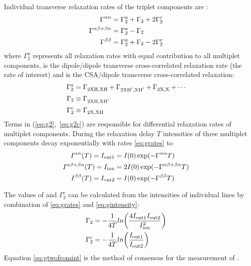 \documentclass[twocolumn]{svjour3}           %
\begin{document}
Individual transverse relaxation rates of the triplet components are 
\cite{kumar_cross-correlations_2000,banci_side_2001,miclet_relaxation-optimized_2004}:
\begin{subequations}
\label{eq:grates} 
\begin{align}
\label{eq:gaa} 
  \textrm{\ensuremath{\Gamma}}^{\alpha\alpha}    & = \Gamma_2^a + \Gamma_2 + 2 \Gamma_2^c  \\
  \label{eq:gab} 
  \textrm{\ensuremath{\Gamma}}^{\alpha\beta + \beta\alpha}  & = \Gamma_2^a - \Gamma_2 \\
  \label{eq:gbb} 
  \textrm{\ensuremath{\Gamma}}^{\beta\beta}    & = \Gamma_2^a + \Gamma_2 - 2 \Gamma_2^c
\end{align}
\end{subequations}
where $\Gamma_2^a$ represents all relaxation rates with equal contribution 
to all  multiplet components, \gtwo{} is the dipole\slash dipole transverse 
cross-correlated relaxation rate (the rate of interest) and \gtwoCSA{} is 
the CSA\slash dipole transverse cross-correla\-ted relaxation:
\begin{subequations}
\label{eq:gcompounds} 
\begin{align}
 \label{eq:g2a} 
 \Gamma_2^a & = \Gamma_\text{2{X\ensuremath{\text{H}},X\ensuremath{\text{H}}}}^\text{} + 
               \Gamma_\text{2{X\ensuremath{\text{H}'},X\ensuremath{\text{H}'}}}^\text{} +
               \Gamma_\text{2{X,X}}^\text{} + \cdots \\
 \label{eq:g2} 
 \Gamma_2 & \equiv \Gamma_\text{2{X\ensuremath{\text{H}},X\ensuremath{\text{H}'}}}^\text{} \\
  \label{eq:g2c} 
 \Gamma_2^c & \equiv \Gamma_\text{2{X,X\ensuremath{\text{H}}}}^\text{} 
\end{align}
\end{subequations}
Terms in (\ref{eq:g2},~\ref{eq:g2c}) are responsible for
differential relaxation rates of multiplet components.
During the relaxation delay $T$ intensities of three
mul\-ti\-plet components decay exponentially 
with rates \eqref{eq:grates} to
\begin{subequations}
\label{eq:gintensity} 
\begin{align}
  \label{eq:gint:aa} 
    \textrm{\ensuremath{I}}^{\alpha\alpha}(T)    = I_\textrm{out1} & = I(0)\exp(-\textrm{\ensuremath{\Gamma}}^{\alpha\alpha} T) \\
  \label{eq:gint:abba} 
    \textrm{\ensuremath{I}}^{\alpha\beta + \beta\alpha}(T)  = I_\textrm{inn}  &  = 2 I(0)\exp(-\textrm{\ensuremath{\Gamma}}^{\alpha\beta + \beta\alpha} T) \\
  \label{eq:gint:bb} 
  \textrm{\ensuremath{I}}^{\beta\beta}(T)   = I_\textrm{out2} &= I(0)\exp(-\textrm{\ensuremath{\Gamma}}^{\beta\beta} T) 
\end{align}
\end{subequations}

The values of \gtwo{} and $\Gamma_2^c$ can be calculated from the intensities 
of individual lines by combination of 
\eqref{eq:grates} and \eqref{eq:gintensity}:
\begin{align}
\label{eq:gtwofromint}
  \Gamma_2 & = - \frac{1}{4T} ln\biggl(\frac{4 I_\textrm{out1} I_\textrm{out2}}{I_\textrm{inn}^2}\biggr)\\
\label{eq:gcsafromint}
  \Gamma_2^c & = - \frac{1}{4T} ln\biggl(\frac{I_\textrm{out1}}{I_\textrm{out2}}\biggr)
\end{align}
Equation \eqref{eq:gtwofromint} is the method of consensus for the measurement of 
\gtwo{}
\cite{banci_side_2001,zheng_measurement_2004,yang_study_1998}. 
\end{document}
